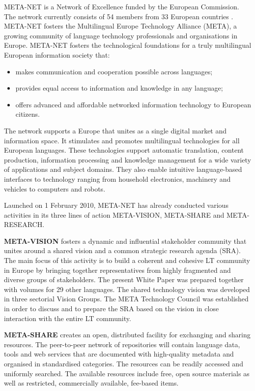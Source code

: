 \begin{multicols}{2}
META-NET is a Network of Excellence funded by the European Commission. The network currently consists of 54 members from 33 European countries \cite{rehm2011}. META-NET fosters the Multilingual Europe Technology Alliance (META), a growing community of language technology professionals and organisations in Europe. META-NET fosters the technological foundations for a truly multilingual European information society that:

\begin{itemize}
\item makes communication and cooperation possible across languages;
\item provides equal access to information and knowledge in any language;
\item offers advanced and affordable networked information technology to European citizens.
\end{itemize}

The network supports a Europe that unites as a single digital market and information space. It stimulates and promotes multilingual technologies for all European languages. These technologies support automatic translation, content production, information processing and knowledge management for a wide variety of applications and subject domains. They also enable intuitive language-based interfaces to technology ranging from household electronics, machinery and vehicles to computers and robots.

Launched on 1 February 2010, META-NET has already conducted various activities in its three lines of action META-VISION, META-SHARE and META-RESEARCH.

\textbf{META-VISION} fosters a dynamic and influential stakeholder community that unites around a shared vision and a common strategic research agenda (SRA). The main focus of this activity is to build a coherent and cohesive LT community in Europe by bringing together representatives from highly fragmented and diverse groups of stakeholders. The present White Paper was prepared together with volumes for 29 other languages. The shared technology vision was developed in three sectorial Vision Groups. The META Technology Council was established in order to discuss and to prepare the SRA based on the vision in close interaction with the entire LT community. 

\textbf{META-SHARE} creates an open, distributed facility for exchanging and sharing resources. The peer-to-peer network of repositories will contain language data, tools and web services that are documented with high-quality metadata and organised in standardised categories. The resources can be readily accessed and uniformly searched. The available resources include free, open source materials as well as restricted, commercially available, fee-based items.


\end{multicols}
